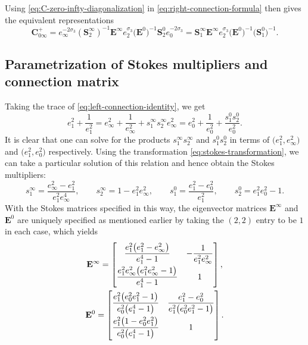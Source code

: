 \documentclass[pdftex]{sigma}
\numberwithin{equation}{section}
\begin{document}
 Using \eqref{eq:C-zero-infty-diagonalization} in \eqref{eq:right-connection-formula} then gives the equivalent representations
 \begin{equation}
 \mathbf{C}_{0\infty}^+
 =e_\infty^{-2\sigma_3}(\mathbf{S}_{2}^\infty )^{-1}\mathbf{E}^\infty e_2^{\sigma_3}\big(\mathbf{E}^0\big)^{-1}\mathbf{S}^0_{2}e_0^{-2\sigma_3}
 =\mathbf{S}_{1}^\infty \mathbf{E}^\infty e_2^{\sigma_3}\big(\mathbf{E}^0\big)^{-1}\big(\mathbf{S}^0_{1}\big)^{-1}.
 \label{eq:C-zero-infty-plus-diagonalization}
 \end{equation}

 \subsection{Parametrization of Stokes multipliers and connection matrix}
 Taking the trace of \eqref{eq:left-connection-identity}, we get
\begin{equation*}
e_1^2+\frac{1}{e_1^2}=e_\infty^2+\frac1{e_\infty^2}+{s^\infty_1 s^\infty_2}{e_\infty^2}=e_0^2+\frac1{e_0^2}+\frac{s^0_1s^0_2}{e_0^2}.
\end{equation*}
It is clear that one can solve for the products $s^\infty_1s^\infty_2$ and $s_1^0s_2^0$ in terms of $\big(e_1^2,e_\infty^2\big)$ and $\big(e_1^2,e_0^2\big)$ respectively. Using the transformation \eqref{eq:stokes-transformation}, we can take a particular solution of this relation and hence obtain the Stokes multipliers:
\begin{equation}
\label{eq:stokes-parameters}
 s^\infty_1=\frac{e_\infty^2-e_1^2}{e_1^2e_\infty^4},\qquad s^\infty_2=1-e_1^2e_\infty^2,\qquad s^0_1=\frac{e_1^2-e_0^2}{e_1^2},\qquad s^0_2={e_1^2e_0^2 - 1}.
\end{equation}
With the Stokes matrices specified in this way, the eigenvector matrices $\mathbf{E}^\infty$ and $\mathbf{E}^0$ are uniquely specified as mentioned earlier by taking the $(2,2)$ entry to be $1$ in each case, which yields
\begin{gather}
\mathbf{E}^{\infty}=\left[
\begin{matrix}
 \dfrac{e_1^2 \big(e_1^2-e_\infty^2\big)}{e_1^4-1} & -\dfrac{1}{e_1^2e_\infty^2} \vspace{1mm} \\
 \dfrac{e_1^2 e_\infty^2\big(e_1^2 e_\infty^2-1\big)}{e_1^4-1} & 1
\end{matrix}
\right],\label{eq:E-infinity-formula}\\
\mathbf{E}^{0}=\left[
\begin{matrix}
 \dfrac{e_1^2 \big(e_0^2 e_1^2-1\big)}{e_0^2 \big(e_1^4-1\big)} & \dfrac{e_1^2-e_0^2}{e_1^2 \big(e_0^2 e_1^2-1\big)} \vspace{1mm}\\
 \dfrac{e_1^2 \big(1 - e_0^2 e_1^2\big)}{e_0^2 \big(e_1^4-1\big)} & 1
\end{matrix}
\right].\label{eq:E-zero-formula}
\end{gather}
\end{document}

